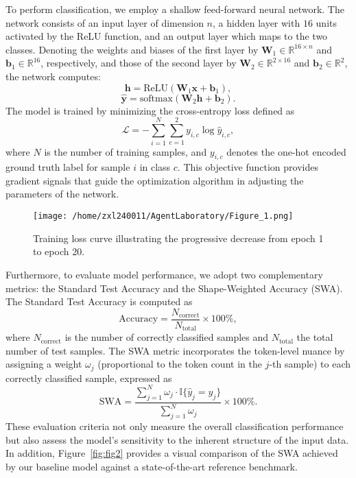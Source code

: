 \documentclass{article}
\begin{document}
To perform classification, we employ a shallow feed-forward neural network. The network consists of an input layer of dimension \( n \), a hidden layer with \( 16 \) units activated by the ReLU function, and an output layer which maps to the two classes. Denoting the weights and biases of the first layer by \( \mathbf{W}_1 \in \mathbb{R}^{16 \times n} \) and \( \mathbf{b}_1 \in \mathbb{R}^{16} \), respectively, and those of the second layer by \( \mathbf{W}_2 \in \mathbb{R}^{2 \times 16} \) and \( \mathbf{b}_2 \in \mathbb{R}^{2} \), the network computes:
\[
\boldsymbol{h} = \text{ReLU}(\mathbf{W}_1 \boldsymbol{x} + \mathbf{b}_1),
\]
\[
\hat{\boldsymbol{y}} = \text{softmax}(\mathbf{W}_2 \boldsymbol{h} + \mathbf{b}_2).
\]
The model is trained by minimizing the cross-entropy loss defined as
\[
\mathcal{L} = -\sum_{i=1}^{N} \sum_{c=1}^{2} y_{i,c} \log \hat{y}_{i,c},
\]
where \( N \) is the number of training samples, and \( y_{i,c} \) denotes the one-hot encoded ground truth label for sample \( i \) in class \( c \). This objective function provides gradient signals that guide the optimization algorithm in adjusting the parameters of the network.

\begin{figure}[h]
\caption{Training loss curve illustrating the progressive decrease from epoch 1 to epoch 20.}
\centering
\texttt{[image: /home/zxl240011/AgentLaboratory/Figure\_1.png]}
\label{fig:fig1}
\end{figure}

Furthermore, to evaluate model performance, we adopt two complementary metrics: the Standard Test Accuracy and the Shape-Weighted Accuracy (SWA). The Standard Test Accuracy is computed as
\[
\text{Accuracy} = \frac{N_{\text{correct}}}{N_{\text{total}}} \times 100\%,
\]
where \( N_{\text{correct}} \) is the number of correctly classified samples and \( N_{\text{total}} \) the total number of test samples. The SWA metric incorporates the token-level nuance by assigning a weight \( \omega_j \) (proportional to the token count in the \( j \)-th sample) to each correctly classified sample, expressed as
\[
\text{SWA} = \frac{\sum_{j=1}^{N} \omega_j \cdot \mathbb{I}\{ \hat{y}_j = y_j \}}{\sum_{j=1}^{N} \omega_j} \times 100\%.
\]
These evaluation criteria not only measure the overall classification performance but also assess the model's sensitivity to the inherent structure of the input data. In addition, Figure~\ref{fig:fig2} provides a visual comparison of the SWA achieved by our baseline model against a state-of-the-art reference benchmark.
\end{document}
